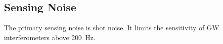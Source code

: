 \subsection{Sensing Noise}
The primary sensing noise is shot noise. It limits the sensitivity of
GW interferometers above 200~Hz.




















